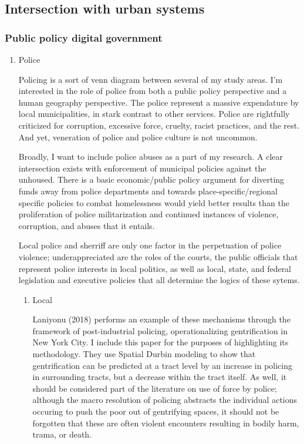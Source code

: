 \subsection{Intersection with urban systems}
\subsubsection{Public policy digital government}
\begin{enumerate}
\item Police
  
Policing is a sort of venn diagram between several of my study
areas. I'm interested in the role of police from both a public policy
perspective and a human geography perspective. The police represent a
massive expendature by local municipalities, in stark contrast to
other services. Police are rightfully criticized for corruption,
excessive force, cruelty, racist practices, and the rest. And yet,
veneration of police and police culture is not uncommon.

Broadly, I want to include police abuses as a part of my research. A
clear intersection exists with enforcement of municipal policies
against the unhoused. There is a basic economic/public policy argument
for diverting funds away from police departments and towards
place-specific/regional specific policies to combat homelessness would
yield better results than the proliferation of police militarization
and continued instances of violence, corruption, and abuses that it
entails.

Local police and sherriff are only one factor in the perpetuation of
police violence; underappreciated are the roles of the courts, the
public officials that represent police interests in local politics, as
well as local, state, and federal legislation and executive policies
that all determine the logics of these sytems.

\begin{enumerate}
\item Local

Laniyonu (2018) performs an example of these mechanisms through the
framework of post-industrial policing, operationalizing gentrification
in New York City. I include this paper for the purposes of
highlighting its methodology. They use Spatial Durbin modeling to show
that gentrification can be predicted at a tract level by an increase
in policing in surrounding tracts, but a decrease within the tract
itself. As well, it should be considered part of the literature on use
of force by police; although the macro resolution of policing
abstracts the individual actions occuring to push the poor out of
gentrifying spaces, it should not be forgotten that these are often
violent encounters resulting in bodily harm, trama, or death.



\end{enumerate}
\end{enumerate}
